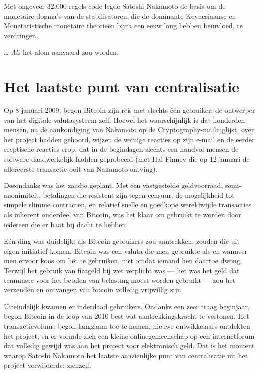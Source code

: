 \documentclass[
  a5paper,
  smalldemyvopaper,11pt,twoside,onecolumn,openright,extrafontsizes,
hidelinks]{memoir}
\begin{document}
Met ongeveer 32.000 regels code legde Satoshi Nakamoto de basis om de
monetaire dogma's van de stabilisatoren, die de dominante Keynesiaanse
en Monetaristische monetaire theorieën bijna een eeuw lang hebben
beïnvloed, te verdringen.

\ldots{} \emph{Als} het alom aanvaard zou worden.

\section{Het laatste punt van
centralisatie}\label{het-laatste-punt-van-centralisatie}

Op 8 januari 2009, begon Bitcoin zijn reis met slechts één gebruiker: de
ontwerper van het digitale valutasysteem zelf. Hoewel het waarschijnlijk
is dat honderden mensen, na de aankondiging van Nakamoto op de
Cryptography-mailinglijst, over het project hadden gehoord, wijzen de
weinige reacties op zijn e-mail en de eerder sceptische reacties erop,
dat in de begindagen slechts een handvol mensen de software
daadwerkelijk hadden geprobeerd (met Hal Finney die op 12 januari de
allereerste transactie ooit van Nakamoto ontving).

Desondanks was het zaadje geplant. Met een vastgestelde geldvoorraad,
semi-anonimiteit, betalingen die resistent zijn tegen censuur, de
mogelijkheid tot simpele slimme contracten, en relatief snelle en
goedkope wereldwijde transacties als inherent onderdeel van Bitcoin, was
het klaar om gebruikt te worden door iedereen die er baat bij dacht te
hebben.

Eén ding was duidelijk: als Bitcoin gebruikers zou aantrekken, zouden
die uit eigen initiatief komen. Bitcoin was een valuta die men gebruikte
als en wanneer men ervoor koos om het te gebruiken, niet omdat iemand
hen daartoe dwong. Terwijl het gebruik van fiatgeld bij wet verplicht
was --- het was het geld dat tenminste voor het betalen van belasting
moest worden gebruikt --- zou het verzenden en ontvangen van bitcoin
volledig vrijwillig zijn.

Uiteindelijk kwamen er inderdaad gebruikers. Ondanks een zeer traag
beginjaar, begon Bitcoin in de loop van 2010 best wat aantrekkingskracht
te vertonen. Het transactievolume begon langzaam toe te nemen, nieuwe
ontwikkelaars ontdekten het project, en er vormde zich een kleine
onlinegemeenschap op een internetforum dat volledig gewijd was aan het
project voor elektronisch geld. Dat is het moment waarop Satoshi
Nakamoto het laatste aanzienlijke punt van centralisatie uit het project
verwijderde: zichzelf.
\end{document}
